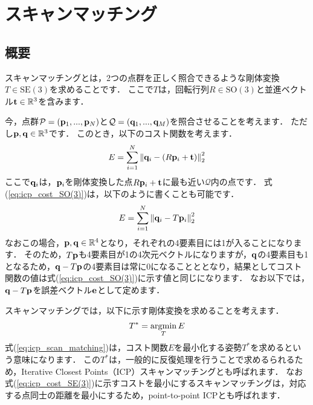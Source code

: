 \section{スキャンマッチング}

\subsection{概要}

スキャンマッチングとは，2つの点群を正しく照合できるような剛体変換$T \in \mathrm{SE}(3)$を求めることです．
ここで$T$は，回転行列$R \in \mathrm{SO}(3)$と並進ベクトル${\bf t} \in \mathbb{R}^{3}$を含みます．

今，点群$\mathcal{P} = ({\bf p}_{1}, ..., {\bf p}_{N})$と$\mathcal{Q} = ({\bf q}_{1}, ..., {\bf q}_{M})$を照合させることを考えます．
ただし${\bf p}, {\bf q} \in \mathbb{R}^{3}$です．
このとき，以下のコスト関数を考えます．
%
\begin{align}
  E = \sum_{i=1}^{N} \left\| {\bf q}_{i} - \left( R {\bf p}_{i} + {\bf t} \right) \right\|_{2}^{2}
  \label{eq:icp_cost_SO(3)}
\end{align}
%
ここで${\bf q}_{i}$は，${\bf p}_{i}$を剛体変換した点$R {\bf p}_{i} + {\bf t}$に最も近い$\mathcal{Q}$内の点です．
式(\ref{eq:icp_cost_SO(3)})は，以下のように書くことも可能です．
%
\begin{align}
  E = \sum_{i=1}^{N} \left\| {\bf q}_{i} - T {\bf p}_{i} \right\|_{2}^{2}
  \label{eq:icp_cost_SE(3)}
\end{align}
%
なおこの場合，${\bf p}, {\bf q} \in \mathbb{R}^{4}$となり，それぞれの4要素目には1が入ることになります．
そのため，$T {\bf p}$も4要素目が1の4次元ベクトルになりますが，${\bf q}$の4要素目も1となるため，${\bf q} - T {\bf p}$の4要素目は常に0になることととなり，結果としてコスト関数の値は式(\ref{eq:icp_cost_SO(3)})に示す値と同じになります．
なお以下では，${\bf q} - T {\bf p}$を誤差ベクトル${\bf e}$として定めます．

スキャンマッチングでは，以下に示す剛体変換を求めることを考えます．
%
\begin{align}
  T^{*} = \mathop{\rm argmin}\limits_{T} E
  \label{eq:icp_scan_matching}
\end{align}
%
式(\ref{eq:icp_scan_matching})は，コスト関数$E$を最小化する姿勢$T^{*}$を求めるという意味になります．
この$T^{*}$は，一般的に反復処理を行うことで求めるられるため，Iterative Closest Points（ICP）スキャンマッチングとも呼ばれます．
なお式(\ref{eq:icp_cost_SE(3)})に示すコストを最小にするスキャンマッチングは，対応する点同士の距離を最小にするため，point-to-point ICPとも呼ばれます．

